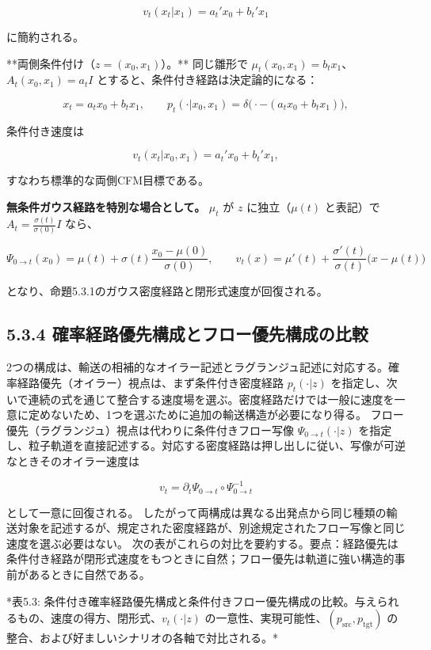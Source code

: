 \[
v_t(x_t|x_1)=a_t'x_0+b_t'x_1
\]


に簡約される。

**両側条件付け（$z=(x_0,x_1)$）。** 同じ雛形で $\mu_t(x_0,x_1)=b_t x_1$、$A_t(x_0,x_1)=a_t I$ とすると、条件付き経路は決定論的になる：

\[
x_t=a_t x_0+b_t x_1,\qquad p_t(\cdot|x_0,x_1)=\delta\bigl(\cdot-(a_t x_0+b_t x_1)\bigr),
\]


条件付き速度は

\[
v_t(x_t|x_0,x_1)=a_t'x_0+b_t'x_1,
\]


すなわち標準的な両側CFM目標である。

\textbf{無条件ガウス経路を特別な場合として。} $\mu_t$ が $z$ に独立（$\mu(t)$ と表記）で $A_t=\frac{\sigma(t)}{\sigma(0)}I$ なら、

\[
\Psi_{0\to t}(x_0)=\mu(t)+\sigma(t)\frac{x_0-\mu(0)}{\sigma(0)},\qquad
v_t(x)=\mu'(t)+\frac{\sigma'(t)}{\sigma(t)}\bigl(x-\mu(t)\bigr)
\]


となり、命題5.3.1のガウス密度経路と閉形式速度が回復される。

\subsection*{5.3.4 確率経路優先構成とフロー優先構成の比較}


2つの構成は、輸送の相補的なオイラー記述とラグランジュ記述に対応する。確率経路優先（オイラー）視点は、まず条件付き密度経路 $p_t(\cdot|z)$ を指定し、次いで連続の式を通じて整合する速度場を選ぶ。密度経路だけでは一般に速度を一意に定めないため、1つを選ぶために追加の輸送構造が必要になり得る。
フロー優先（ラグランジュ）視点は代わりに条件付きフロー写像 $\Psi_{0\to t}(\cdot|z)$ を指定し、粒子軌道を直接記述する。対応する密度経路は押し出しに従い、写像が可逆なときそのオイラー速度は

\[
v_t=\partial_t\Psi_{0\to t}\circ\Psi_{0\to t}^{-1}
\]


として一意に回復される。
したがって両構成は異なる出発点から同じ種類の輸送対象を記述するが、規定された密度経路が、別途規定されたフロー写像と同じ速度を選ぶ必要はない。
次の表がこれらの対比を要約する。要点：経路優先は条件付き経路が閉形式速度をもつときに自然；フロー優先は軌道に強い構造的事前があるときに自然である。



*表5.3: 条件付き確率経路優先構成と条件付きフロー優先構成の比較。与えられるもの、速度の得方、閉形式、$v_t(\cdot|z)$ の一意性、実現可能性、$(p_{\mathrm{src}},p_{\mathrm{tgt}})$ の整合、および好ましいシナリオの各軸で対比される。*

